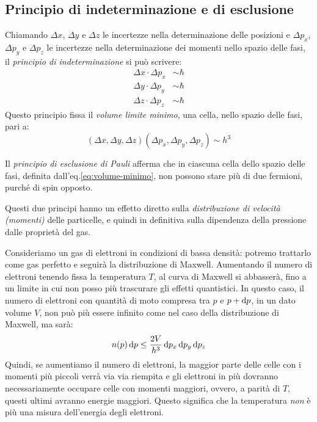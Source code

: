 \subsection{Principio di indeterminazione e di esclusione}\label{sec:principio-indeterminazione}
Chiamando $\Delta x$, $\Delta y$ e $\Delta z$ le incertezze nella determinazione delle posizioni e $\Delta p_x$, $\Delta p_y$ e $\Delta p_z$ le incertezze nella determinazione dei momenti nello spazio delle fasi, il \emph{principio di indeterminazione} si può scrivere:
\begin{subequations}
\label{eq:principio-indeterminazione}
\begin{align}
\Delta x \cdot \Delta p_x &\sim \hbar \\
\Delta y \cdot \Delta p_y &\sim \hbar \\
\Delta z \cdot \Delta p_z &\sim \hbar 
\end{align}
\end{subequations}
Questo principio fissa il \emph{volume limite minimo}, una cella, nello spazio delle fasi, pari a:
\begin{equation}\label{eq:volume-minimo}
(\Delta x, \Delta y,\Delta z) (\Delta p_x, \Delta p_y, \Delta p_z) \sim h^3
\end{equation}

Il \emph{principio di esclusione di Pauli} afferma che in ciascuna cella dello spazio delle fasi, definita dall'eq.\eqref{eq:volume-minimo}, non possono stare più di due fermioni, purché di spin opposto.

Questi due principi hanno un effetto diretto sulla \emph{distribuzione di velocità (momenti)} delle particelle, e quindi in definitiva sulla dipendenza della pressione dalle proprietà del gas. 

Consideriamo un gas di elettroni in condizioni di bassa densità: potremo trattarlo come gas perfetto e seguirà la distribuzione di Maxwell. Aumentando il numero di elettroni tenendo fissa la temperatura $T$, al curva di Maxwell si abbasserà, fino a un limite in cui non posso più trascurare gli effetti quantistici. In questo caso, il numero di elettroni con quantità di moto compresa tra $p$ e $p + \mathop{}\!\mathrm{d} p$, in  un dato volume $V$, non può più essere infinito come nel caso della distribuzione di Maxwell, ma sarà:
\[
n(p) \mathop{}\!\mathrm{d} p \leq \frac{2V}{h^3} \mathop{}\!\mathrm{d} p_x \mathop{}\!\mathrm{d} p_y \mathop{}\!\mathrm{d} p_z
\]
Quindi, se aumentiamo il numero di elettroni, la maggior parte delle celle con i momenti più piccoli verrà via via riempita e gli elettroni in più dovranno necessariamente occupare celle con momenti maggiori, ovvero, a parità di $T$, questi ultimi avranno energie maggiori. Questo significa che la temperatura \emph{non} è più una misura dell'energia degli elettroni. 

